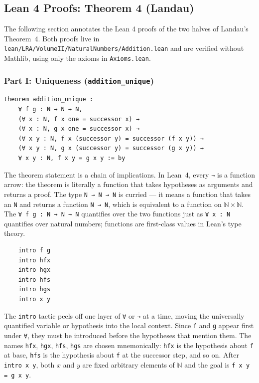 %

\subsection*{Lean 4 Proofs: Theorem 4 (Landau)}

The following section annotates the Lean 4 proofs of the two halves of
Landau's Theorem~4. Both proofs live in
\texttt{lean/LRA/VolumeII/NaturalNumbers/Addition.lean} and are verified
without Mathlib, using only the axioms in \texttt{Axioms.lean}.

\subsubsection*{Part I: Uniqueness (\texttt{addition\_unique})}

\begin{verbatim}
theorem addition_unique :
    ∀ f g : N → N → N,
    (∀ x : N, f x one = successor x) →
    (∀ x : N, g x one = successor x) →
    (∀ x y : N, f x (successor y) = successor (f x y)) →
    (∀ x y : N, g x (successor y) = successor (g x y)) →
    ∀ x y : N, f x y = g x y := by
\end{verbatim}

\noindent
The theorem statement is a chain of implications. In Lean~4, every
\verb|→| is a function arrow: the theorem is literally a function that
takes hypotheses as arguments and returns a proof. The type
\verb|N → N → N| is curried --- it means a function that takes an
\verb|N| and returns a function \verb|N → N|, which is equivalent to a
function on $\mathbb{N} \times \mathbb{N}$.
The \verb|∀ f g : N → N → N| quantifies over the two functions just as
\verb|∀ x : N| quantifies over natural numbers; functions are first-class
values in Lean's type theory.

\begin{verbatim}
    intro f g
    intro hfx
    intro hgx
    intro hfs
    intro hgs
    intro x y
\end{verbatim}

\noindent
The \verb|intro| tactic peels off one layer of \verb|∀| or \verb|→| at a
time, moving the universally quantified variable or hypothesis into the
local context. Since \verb|f| and \verb|g| appear first under \verb|∀|,
they must be introduced before the hypotheses that mention them.
The names \verb|hfx|, \verb|hgx|, \verb|hfs|, \verb|hgs| are chosen
mnemonically: \verb|hfx| is the hypothesis about \verb|f| at base,
\verb|hfs| is the hypothesis about \verb|f| at the successor step, and
so on. After \verb|intro x y|, both $x$ and $y$ are fixed arbitrary
elements of $\mathbb{N}$ and the goal is \verb|f x y = g x y|.

